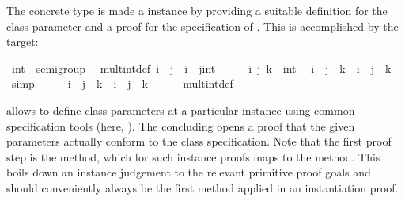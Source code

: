 \begin{isabellebody}
\begin{isamarkuptext}
\end{isamarkuptext}%
\isamarkuptrue%
%
\isamarkuptrue%
%
\begin{isamarkuptext}%
The concrete type  is made a 
  instance by providing a suitable definition for the class parameter
  \isa{{\isacharparenleft}{\isasymotimes}{\isacharparenright}} and a proof for the specification of \hyperlink{fact.assoc}{\mbox{}}.
  This is accomplished by the \hyperlink{command.instantiation}{\mbox{}} target:%
\end{isamarkuptext}%
\isamarkuptrue%
%
\isadelimquote
%
\endisadelimquote
%
\isatagquote
{}\isamarkupfalse%
\ int\ {\isacharcolon}{\isacharcolon}\ semigroup\isanewline
{}\isanewline
\isanewline
{}\isamarkupfalse%
\isanewline
\ \ mult{\isacharunderscore}int{\isacharunderscore}def{\isacharcolon}\ {\isachardoublequoteopen}i\ {\isasymotimes}\ j\ {\isacharequal}\ i\ {\isacharplus}\ {\isacharparenleft}j{\isasymColon}int{\isacharparenright}{\isachardoublequoteclose}\isanewline
\isanewline
{}\isamarkupfalse%
\ \isamarkupfalse%
\isanewline
\ \ \isamarkupfalse%
\ i\ j\ k\ {\isacharcolon}{\isacharcolon}\ int\ \isamarkupfalse%
\ {\isachardoublequoteopen}{\isacharparenleft}i\ {\isacharplus}\ j{\isacharparenright}\ {\isacharplus}\ k\ {\isacharequal}\ i\ {\isacharplus}\ {\isacharparenleft}j\ {\isacharplus}\ k{\isacharparenright}{\isachardoublequoteclose}\ \isamarkupfalse%
\ simp\isanewline
\ \ \isamarkupfalse%
\ \isamarkupfalse%
\ {\isachardoublequoteopen}{\isacharparenleft}i\ {\isasymotimes}\ j{\isacharparenright}\ {\isasymotimes}\ k\ {\isacharequal}\ i\ {\isasymotimes}\ {\isacharparenleft}j\ {\isasymotimes}\ k{\isacharparenright}{\isachardoublequoteclose}\isanewline
\ \ \ \ \isamarkupfalse%
\ mult{\isacharunderscore}int{\isacharunderscore}def\ \isacommand{{\isachardot}}\isamarkupfalse%
\isanewline
{}\isamarkupfalse%
\isanewline
\isanewline
{}\isamarkupfalse%
%
\endisatagquote
{\isafoldquote}%
%
\isadelimquote
%
\endisadelimquote
%
\begin{isamarkuptext}%
\noindent \hyperlink{command.instantiation}{\mbox{}} allows to define class parameters
  at a particular instance using common specification tools (here,
  \hyperlink{command.definition}{\mbox{}}).  The concluding \hyperlink{command.instance}{\mbox{}}
  opens a proof that the given parameters actually conform
  to the class specification.  Note that the first proof step
  is the \hyperlink{method.default}{\mbox{}} method,
  which for such instance proofs maps to the \hyperlink{method.intro-classes}{\mbox{}} method.
  This boils down an instance judgement to the relevant primitive
  proof goals and should conveniently always be the first method applied
  in an instantiation proof.


\end{isamarkuptext}
\end{isabellebody}
